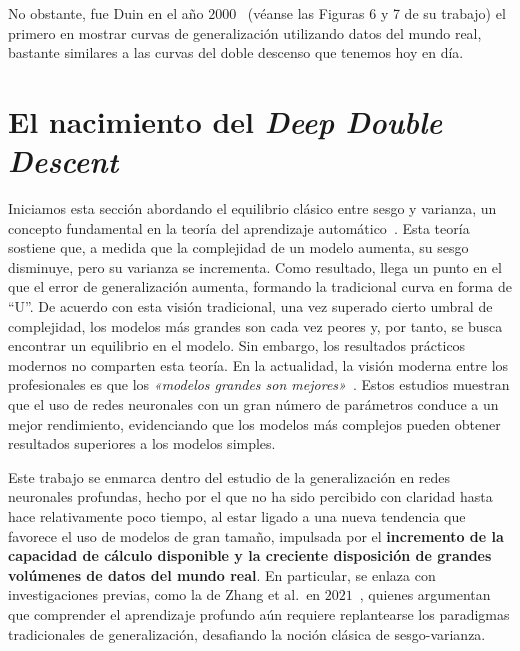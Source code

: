 No obstante, fue Duin en el año $2000$~\cite{Duin2000} (véanse las Figuras 6 y 7 de su trabajo) el primero en mostrar curvas de generalización utilizando datos del mundo real, bastante similares a las curvas del doble descenso que tenemos hoy en día.

\section{El nacimiento del \textit{Deep Double Descent}}\label{}

Iniciamos esta sección abordando el equilibrio clásico entre sesgo y varianza, un concepto fundamental en la teoría del aprendizaje automático~\cite{Geman1992, Hastie2001, Bengio2010}. Esta teoría sostiene que, a medida que la complejidad de un modelo aumenta, su sesgo disminuye, pero su varianza se incrementa. Como resultado, llega un punto en el que el error de generalización aumenta, formando la tradicional curva en forma de ``U''. De acuerdo con esta visión tradicional, una vez superado cierto umbral de complejidad, los modelos más grandes son cada vez peores y, por tanto, se busca encontrar un equilibrio en el modelo. Sin embargo, los resultados prácticos modernos no comparten esta teoría. En la actualidad, la visión moderna entre los profesionales es que los \emph{«modelos grandes son mejores»}~\cite{Krizhevsky2012, Neal2019, Huang2019, Szegedy2014}. Estos estudios muestran que el uso de redes neuronales con un gran número de parámetros conduce a un mejor rendimiento, evidenciando que los modelos más complejos pueden obtener resultados superiores a los modelos simples.

Este trabajo se enmarca dentro del estudio de la generalización en redes neuronales profundas, hecho por el que no ha sido percibido con claridad hasta hace relativamente poco tiempo, al estar ligado a una nueva tendencia que favorece el uso de modelos de gran tamaño, impulsada por el \textbf{incremento de la capacidad de cálculo disponible y la creciente disposición de grandes volúmenes de datos del mundo real}. En particular, se enlaza con investigaciones previas, como la de Zhang et al.\ en $2021$~\cite{Zhang2021}, quienes argumentan que comprender el aprendizaje profundo aún requiere replantearse los paradigmas tradicionales de generalización, desafiando la noción clásica de sesgo-varianza.

